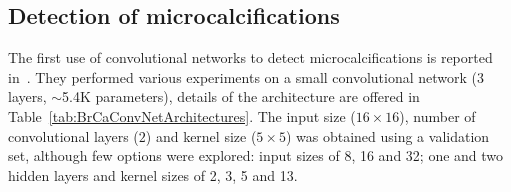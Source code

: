 \subsection{Detection of microcalcifications}
\begin{comment}
- detect microcalcifications
- only years after lecun showed it to be good on the mnist dataset.
- preselected images
- Background removal with wavelet high pass filtering ("a three-level wavelet transform was used and only the lowest frequency was eliminated for high-pass filtering before image reconstruction."). For lung nodules: Background removal like constrast enhancement.
- YES/NO output. For lung nodules: degrees of sensitivity in output(1-10) instead of disease/no disease . 
- Rotation and translation invariance. 0,90,180,270 and flipped over. (all of this on the small 32 by 32 images). No use of translation, it talks about it, though.
- Uses ROC/AUC.
- Each pixel represented 0.105 mm. (for instance 16 pixel input was 1.7mm)
- Same set used for validation and test
- using the data augmented versions one after the other in training gives better performance here (not sure why)
- 30-fold crossvalidation results reported (no test set): 0.89 AUC for individual miscrocalcifications and 0.97 for clustered microcalcif. 
- not quite clear if label were beningn/malign, microcalc/non-microcalc. It hink it is detection not diagonsis
- not clear how they measure the detection of microcalc. I think, of those microcalc detected from the normal algorithm if more than 3 were in the same 1 cm^2 area, it was considered as if the convnet detcted a cluster. 
- Easier to detect clusters these way because there could be 20 micorcalcif in a 1 cm^2 area and it only needs to detect 3.
- Bunch of questions on how on hell is this done. It could be done in a way that would help a lot the results, maybe that is why they have 0.97 AUC
\end{comment}
The first use of convolutional networks to detect microcalcifications is reported in~\cite{Lo1995}. They performed various experiments on a small convolutional network (3 layers, $\sim$5.4K parameters), details of the architecture are offered in Table~\ref{tab:BrCaConvNetArchitectures}. The input size ($16\times 16$), number of convolutional layers ($2$) and kernel size ($5\times5$) was obtained using a validation set, although few options were explored: input sizes of 8, 16 and 32; one and two hidden layers and kernel sizes of 2, 3, 5 and 13.
